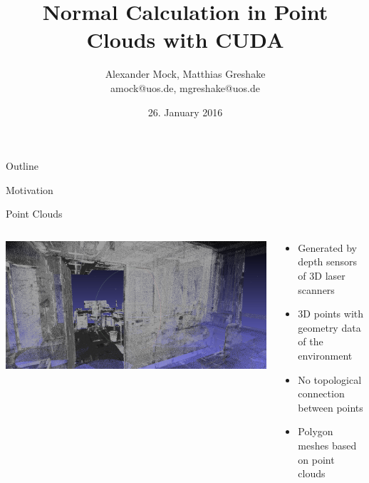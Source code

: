 \documentclass{beamer}
\begin{document}
\title{Normal Calculation in Point Clouds with CUDA}
\author[Alexander Mock, Matthias Greshake]{Alexander Mock, Matthias Greshake\\ {\scriptsize amock@uos.de, mgreshake@uos.de}}
\date{26. January 2016}

\begin{frame}[plain]
	\titlepage
\end{frame}

\begin{frame}{Outline}
	\tableofcontents
\end{frame}

\begin{frame}{Motivation}
\end{frame}

\begin{frame}{Point Clouds}
	\begin{columns}
		\begin{column}{0.5\textwidth}
			\includegraphics[width=1.0\textwidth]{police_point_cloud.png}
		\end{column}
		\begin{column}{0.5\textwidth}
			\begin{itemize}
				\item Generated by depth sensors of 3D laser scanners
				\item 3D points with geometry data of the environment
				\item No topological connection between points
				\item Polygon meshes based on point clouds
			\end{itemize}
		\end{column}
	\end{columns}
\end{frame}
\end{document}
